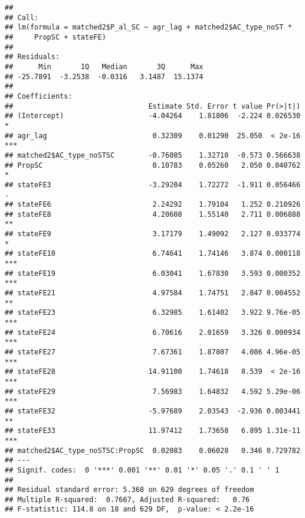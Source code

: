 \documentclass[
]{article}
\newenvironment{Shaded}{\begin{snugshade}}{\end{snugshade}}
\newcommand{\AttributeTok}[1]{\textcolor[rgb]{0.77,0.63,0.00}{#1}}
\newcommand{\FunctionTok}[1]{\textcolor[rgb]{0.00,0.00,0.00}{#1}}
\newcommand{\NormalTok}[1]{#1}
\newcommand{\OtherTok}[1]{\textcolor[rgb]{0.56,0.35,0.01}{#1}}
\newcommand{\SpecialCharTok}[1]{\textcolor[rgb]{0.00,0.00,0.00}{#1}}
\newcommand{\StringTok}[1]{\textcolor[rgb]{0.31,0.60,0.02}{#1}}
\begin{document}
\begin{verbatim}
## 
## Call:
## lm(formula = matched2$P_al_SC ~ agr_lag + matched2$AC_type_noST * 
##     PropSC + stateFE)
## 
## Residuals:
##      Min       1Q   Median       3Q      Max 
## -25.7891  -3.2538  -0.0316   3.1487  15.1374 
## 
## Coefficients:
##                                Estimate Std. Error t value Pr(>|t|)    
## (Intercept)                    -4.04264    1.81806  -2.224 0.026530 *  
## agr_lag                         0.32309    0.01290  25.050  < 2e-16 ***
## matched2$AC_type_noSTSC        -0.76085    1.32710  -0.573 0.566638    
## PropSC                          0.10783    0.05260   2.050 0.040762 *  
## stateFE3                       -3.29204    1.72272  -1.911 0.056466 .  
## stateFE6                        2.24292    1.79104   1.252 0.210926    
## stateFE8                        4.20608    1.55140   2.711 0.006888 ** 
## stateFE9                        3.17179    1.49092   2.127 0.033774 *  
## stateFE10                       6.74641    1.74146   3.874 0.000118 ***
## stateFE19                       6.03041    1.67830   3.593 0.000352 ***
## stateFE21                       4.97584    1.74751   2.847 0.004552 ** 
## stateFE23                       6.32985    1.61402   3.922 9.76e-05 ***
## stateFE24                       6.70616    2.01659   3.326 0.000934 ***
## stateFE27                       7.67361    1.87807   4.086 4.96e-05 ***
## stateFE28                      14.91100    1.74618   8.539  < 2e-16 ***
## stateFE29                       7.56983    1.64832   4.592 5.29e-06 ***
## stateFE32                      -5.97689    2.03543  -2.936 0.003441 ** 
## stateFE33                      11.97412    1.73658   6.895 1.31e-11 ***
## matched2$AC_type_noSTSC:PropSC  0.02083    0.06028   0.346 0.729782    
## ---
## Signif. codes:  0 '***' 0.001 '**' 0.01 '*' 0.05 '.' 0.1 ' ' 1
## 
## Residual standard error: 5.368 on 629 degrees of freedom
## Multiple R-squared:  0.7667, Adjusted R-squared:   0.76 
## F-statistic: 114.8 on 18 and 629 DF,  p-value: < 2.2e-16
\end{verbatim}

\begin{Shaded}
\end{Shaded}
\end{document}
